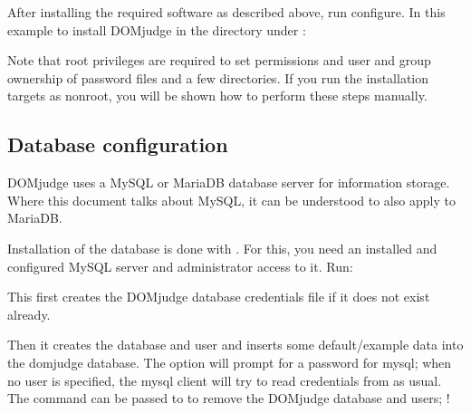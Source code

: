 \documentclass[a4paper,10pt,english,openany]{sphinxmanual}
\begin{document}
\sphinxAtStartPar
After installing the required software as described above, run configure.
In this example to install DOMjudge in the directory  under
:

\begin{sphinxVerbatim}[commandchars=\\\{\}]
 
 
  
\end{sphinxVerbatim}

\sphinxAtStartPar
Note that root privileges are required to set permissions and user and
group ownership of password files and a few directories. If you run
the installation targets as non\sphinxhyphen{}root, you will be shown how to perform
these steps manually.


\subsection{Database configuration}
\label{\detokenize{install-domserver:database-configuration}}
\sphinxAtStartPar
DOMjudge uses a MySQL or MariaDB database server for information storage.
Where this document talks about MySQL, it can be understood to also apply
to MariaDB.

\sphinxAtStartPar
Installation of the database is done with .
For this, you need an installed and configured MySQL server and
administrator access to it. Run:

\begin{sphinxVerbatim}[commandchars=\\\{\}]
 
 \PYG{p}{[}   \PYG{p}{]} \PYG{p}{[} \PYG{p}{]} 
\end{sphinxVerbatim}

\sphinxAtStartPar
This first creates the DOMjudge database credentials file
 if it does not exist already.

\sphinxAtStartPar
Then it creates the database and user and inserts some
default/example data into the domjudge database. The option
 will prompt for a password for mysql; when no user is
specified, the mysql client will try to read
credentials from  as usual. The command
 can be passed to  to
remove the DOMjudge database and users; !
\end{document}
